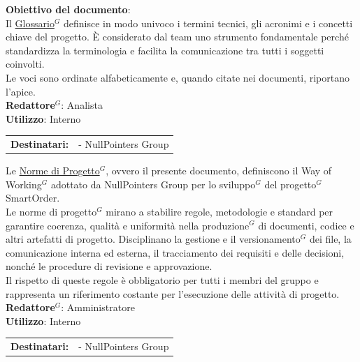 	\textbf{Obiettivo del documento}:\\
	Il \href{https://nullpointersgroup.github.io/Documentazione/output/PB/Documenti%20Interni/Glossario.pdf}{Glossario$^G$} 
	definisce in modo univoco i termini tecnici, gli acronimi e i concetti chiave del progetto. È considerato dal team uno strumento fondamentale perché standardizza la terminologia e facilita la comunicazione tra tutti i soggetti coinvolti.\\
	Le voci sono ordinate alfabeticamente e, quando citate nei documenti, riportano l'apice.\\[0.5em]
	\medskip
	\textbf{Redattore$^G$}: Analista\\
	\medskip
	\textbf{Utilizzo}: Interno\\
	\medskip 
	\begin{tabular}{@{}l l}
		\textbf{Destinatari:} & - NullPointers Group
	\end{tabular}

	Le \href{https://nullpointersgroup.github.io/Documentazione/output/PB/Documenti%20Interni/Norme_di_Progetto.pdf}{Norme di Progetto$^G$}, ovvero il presente documento, definiscono il Way of Working$^G$ adottato da NullPointers Group per lo sviluppo$^G$ del progetto$^G$ SmartOrder.\\
	Le norme di progetto$^G$ mirano a stabilire regole, metodologie e standard per garantire coerenza, qualità e uniformità nella produzione$^G$ di documenti, codice e altri artefatti di progetto. Disciplinano la gestione e il versionamento$^G$ dei file, la comunicazione interna ed esterna, il tracciamento dei requisiti e delle decisioni, nonché le procedure di revisione e approvazione.\\
	Il rispetto di queste regole è obbligatorio per tutti i membri del gruppo e rappresenta un riferimento costante per l'esecuzione delle attività di progetto.\\[0.5em]
	\medskip
	\textbf{Redattore$^G$}: Amministratore\\
	\medskip
	\textbf{Utilizzo}: Interno\\
	\medskip 
	\begin{tabular}{@{}l l}
		\textbf{Destinatari:} & - NullPointers Group
	\end{tabular}

